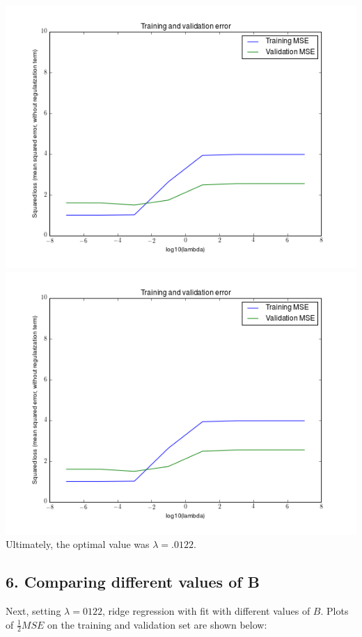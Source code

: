\documentclass[paper=a4, fontsize=11pt]{scrartcl} %
\numberwithin{equation}{section} %
\numberwithin{figure}{section} %
\numberwithin{table}{section} %
\begin{document}
\includegraphics[scale=.6]{./../figures/2_5_5_1.png} \\
\includegraphics[scale=.6]{./../figures/2_5_5_2.png} \\

Ultimately, the optimal value was $\lambda = .0122$.

\subsection*{6. Comparing different values of B}

Next, setting $\lambda = 0122$, ridge regression with fit with different values of $B$. Plots of $\frac{1}{2}MSE$ on the training and validation set are shown below:
\end{document}
